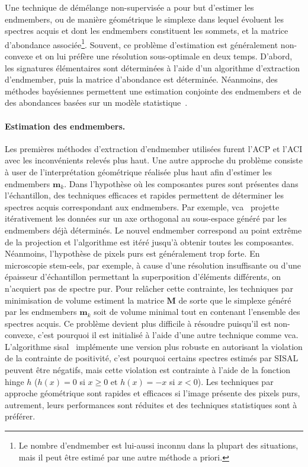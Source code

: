     Une technique de démélange non-supervisée a pour but d'estimer les endmembers, ou de manière géométrique le simplexe dans lequel évoluent les spectres acquis et dont les endmembers constituent les sommets, et la matrice d'abondance associée\footnote{Le nombre d'endmember est lui-aussi inconnu dans la plupart des situations, mais il peut être estimé par une autre méthode a priori.}. Souvent, ce problème d'estimation est généralement non-convexe et on lui préfère une résolution sous-optimale en deux temps. D'abord, les signatures élémentaires sont déterminées à l'aide d'un algorithme d'extraction d'endmember, puis la matrice d'abondance est déterminée. Néanmoins, des méthodes bayésiennes permettent une estimation conjointe des endmembers et de des abondances basées sur un modèle statistique~\cite{dobigeon2009joint,dobigeon2012spectral}.

    \paragraph{Estimation des endmembers.} Les premières méthodes d'extraction d'endmember utilisées furent l'ACP et l'ACI avec les inconvénients relevés plus haut.
    Une autre approche du problème consiste à user de l'interprétation géométrique réalisée plus haut afin d'estimer les endmembers $\mathbf{m}_k$. Dans l'hypothèse où les composantes pures sont présentes dans l'échantillon, des techniques efficaces et rapides permettent de déterminer les spectres acquis correspondant aux endmembers. Par exemple, \gls{vca}~\cite{nascimento2005vertex} projette itérativement les données sur un axe orthogonal au sous-espace généré par les endmembers déjà déterminés. Le nouvel endmember correspond au point extrême de la projection et l'algorithme est itéré jusqu'à obtenir toutes les composantes. Néanmoins, l'hypothèse de pixels purs est généralement trop forte. En microscopie \gls{stem}-\gls{eels}, par exemple, à cause d'une résolution insuffisante ou d'une épaisseur d'échantillon permettant la superposition d'éléments différents, on n'acquiert pas de spectre pur. Pour relâcher cette contrainte, les techniques par minimisation de volume estiment la matrice $\mathbf{M}$ de sorte que le simplexe généré par les endmembers $\mathbf{m}_k$ soit de volume minimal tout en contenant l'ensemble des spectres acquis. Ce problème devient plus difficile à résoudre puisqu'il est non-convexe, c'est pourquoi il est initialisé à l'aide d'une autre technique comme \gls{vca}. L'algorithme \gls{sisal}~\cite{bioucas2009variable} implémente une version plus robuste en autorisant la violation de la contrainte de positivité, c'est pourquoi certains spectres estimés par SISAL peuvent être négatifs, mais cette violation est contrainte à l'aide de la fonction hinge $h$ ($h(x) = 0$ si $x \geq 0$ et $h(x)=-x$ si $x<0$). Les techniques par approche géométrique sont rapides et efficaces si l'image présente des pixels purs, autrement, leurs performances sont réduites et des techniques statistiques sont à préférer.
    
